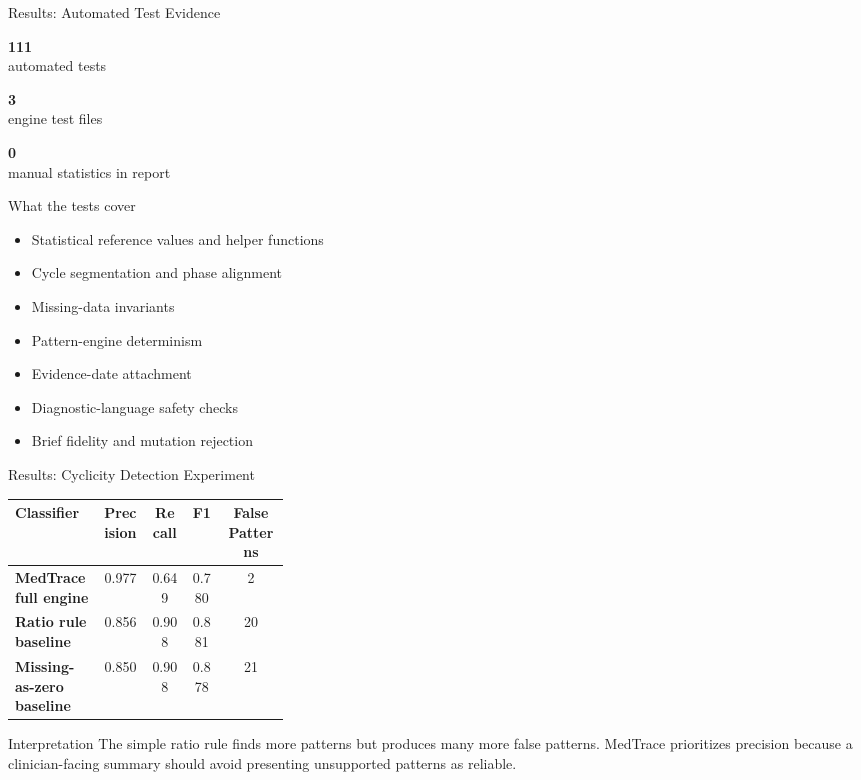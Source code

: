 \documentclass[aspectratio=169,11pt]{beamer}
\newcommand{\scorebox}[2]{%
  \begin{minipage}{0.31\linewidth}
    \centering
    {\Large\textbf{#1}}\\[-1mm]
    {\scriptsize #2}
  \end{minipage}
}
\begin{document}
\begin{frame}{Results: Automated Test Evidence}
  \begin{center}
    \scorebox{111}{automated tests}
    \scorebox{3}{engine test files}
    \scorebox{0}{manual statistics in report}
  \end{center}

  \vspace{3mm}
  \begin{block}{What the tests cover}
    \small
    \begin{itemize}
      \item Statistical reference values and helper functions
      \item Cycle segmentation and phase alignment
      \item Missing-data invariants
      \item Pattern-engine determinism
      \item Evidence-date attachment
      \item Diagnostic-language safety checks
      \item Brief fidelity and mutation rejection
    \end{itemize}
  \end{block}
\end{frame}

\begin{frame}{Results: Cyclicity Detection Experiment}
  \scriptsize
  \begin{tabularx}{\linewidth}{>{\bfseries}p{0.32\linewidth} c c c c}
    \toprule
    Classifier & Precision & Recall & F1 & False Patterns \\
    \midrule
    MedTrace full engine & 0.977 & 0.649 & 0.780 & 2 \\
    Ratio rule baseline & 0.856 & 0.908 & 0.881 & 20 \\
    Missing-as-zero baseline & 0.850 & 0.908 & 0.878 & 21 \\
    \bottomrule
  \end{tabularx}

  \vspace{3mm}
  \begin{block}{Interpretation}
    The simple ratio rule finds more patterns but produces many more false patterns. MedTrace prioritizes precision because a clinician-facing summary should avoid presenting unsupported patterns as reliable.
  \end{block}
\end{frame}
\end{document}
